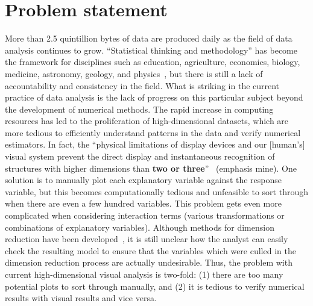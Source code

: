 \section{Problem statement}
\label{sec:intro:problem}

More than 2.5 quintillion bytes of data are produced daily as the field of data analysis continues to grow. ``Statistical thinking and methodology'' has become the framework for disciplines such as education, agriculture, economics, biology, medicine, astronomy, geology, and physics~\cite{efron1986}, but there is still a lack of accountability and consistency in the field. What is striking in the current practice of data analysis is the lack of progress on this particular subject beyond the development of numerical methods. The rapid increase in computing resources has led to the proliferation of high-dimensional datasets, which are more tedious to efficiently understand patterns in the data and verify numerical estimators. In fact, the ``physical limitations of display devices and our [human's] visual system prevent the direct display and instantaneous recognition of structures with higher dimensions than \textbf{two or three}''~\cite{lius2016} (emphasis mine). One solution is to manually plot each explanatory variable against the response variable, but this becomes computationally tedious and unfeasible to sort through when there are even a few hundred variables. This problem gets even more complicated when considering interaction terms (various transformations or combinations of explanatory variables). Although methods for dimension reduction have been developed~\cite{lius2016}, it is still unclear how the analyst can easily check the resulting model to ensure that the variables which were culled in the dimension reduction process are actually undesirable. Thus, the problem with current high-dimensional visual analysis is two-fold: (1) there are too many potential plots to sort through manually, and (2) it is tedious to verify numerical results with visual results and vice versa. 

